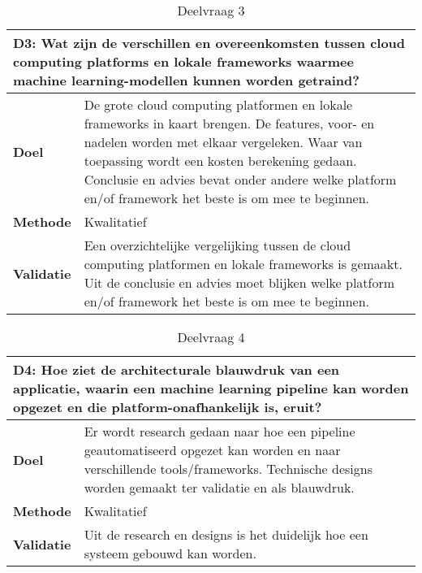 {\begin{table}[hbt!]
\centering
\begin{tabular}{|l|p{.83\linewidth}|}
\hline
\multicolumn{2}{|p{.97\linewidth}|}{\textbf{D3: Wat zijn de verschillen en overeenkomsten tussen cloud computing platforms en lokale frameworks waarmee machine learning-modellen kunnen worden getraind?}} \\ \hline
  \textbf{Doel}&
    De grote cloud computing platformen en lokale frameworks in kaart brengen. De features, voor- en nadelen worden met elkaar vergeleken. Waar van toepassing wordt een kosten berekening gedaan. Conclusie en advies bevat onder andere welke platform en/of framework het beste is om mee te beginnen.
  \\ \hline
  \textbf{Methode}&
    Kwalitatief
  \\ \hline
  \textbf{Validatie}&
    Een overzichtelijke vergelijking tussen de cloud computing platformen en lokale frameworks is gemaakt. Uit de conclusie en advies moet blijken welke platform en/of framework het beste is om mee te beginnen.
  \\ \hline
\end{tabular}
\caption{Deelvraag 3}
\label{table:sq3}
\end{table}

\space
\newpage

\begin{table}[hbt!]
\centering
\begin{tabular}{|l|p{.83\linewidth}|}
\hline
\multicolumn{2}{|p{.97\linewidth}|}{\textbf{D4: Hoe ziet de architecturale blauwdruk van een applicatie, waarin een machine learning pipeline kan worden opgezet en die platform-onafhankelijk is, eruit?}} \\ \hline
  \textbf{Doel}&
    Er wordt research gedaan naar hoe een pipeline geautomatiseerd opgezet kan worden en naar verschillende tools/frameworks. Technische designs worden gemaakt ter validatie en als blauwdruk.
  \\ \hline
  \textbf{Methode}&
    Kwalitatief
  \\ \hline
  \textbf{Validatie}&
    Uit de research en designs is het duidelijk hoe een systeem gebouwd kan worden.
  \\ \hline
\end{tabular}
\caption{Deelvraag 4}
\label{table:sq4}
\end{table}

}

